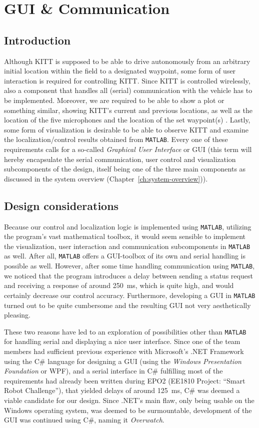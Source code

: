 \documentclass[11pt,titlepage]{report}
\begin{document}
\chapter{GUI \& Communication}
\section{Introduction}
Although KITT is supposed to be able to drive autonomously from an arbitrary initial location within the field to a designated waypoint, some form of user interaction is required for controlling KITT. Since KITT is controlled wirelessly, also a component that handles all (serial) communication with the vehicle has to be implemented. Moreover, we are required to be able to show a plot or something similar, showing KITT's current and previous locations, as well as the location of the five microphones and the location of the set waypoint(s) \cite[114]{epo4-manual}. Lastly, some form of visualization is desirable to be able to observe KITT and examine the localization/control results obtained from \texttt{MATLAB}. Every one of these requirements calls for a so-called \emph{Graphical User Interface} or GUI (this term will hereby encapsulate the serial communication, user control and visualization subcomponents of the design, itself being one of the three main components as discussed in the system overview (Chapter~\ref{ch:system-overview})).

\section{Design considerations}
Because our control and localization logic is implemented using \texttt{MATLAB}, utilizing the program's vast mathematical toolbox, it would seem sensible to implement the visualization, user interaction and communication subcomponents in \texttt{MATLAB} as well. After all, \texttt{MATLAB} offers a GUI-toolbox of its own and serial handling is possible as well. However, after some time handling communication using \texttt{MATLAB}, we noticed that the program introduces a delay between sending a status request and receiving a response of around \SI{250}{ms}, which is quite high, and would certainly decrease our control accuracy. Furthermore, developing a GUI in \texttt{MATLAB} turned out to be quite cumbersome and the resulting GUI not very aesthetically pleasing.

These two reasons have led to an exploration of possibilities other than \texttt{MATLAB} for handling serial and displaying a nice user interface. Since one of the team members had sufficient previous experience with Microsoft's .NET Framework using the C\# language for designing a GUI (using the \emph{Windows Presentation Foundation} or WPF), and a serial interface in C\# fulfilling most of the requirements had already been written during EPO2 (EE1810 Project: ``Smart Robot Challenge''), that yielded delays of around \SI{125}{ms}, C\# was deemed a viable candidate for our design. Since .NET's main flaw, only being usable on the Windows operating system, was deemed to be surmountable, development of the GUI was continued using C\#, naming it \emph{Overwatch}.
\end{document}
